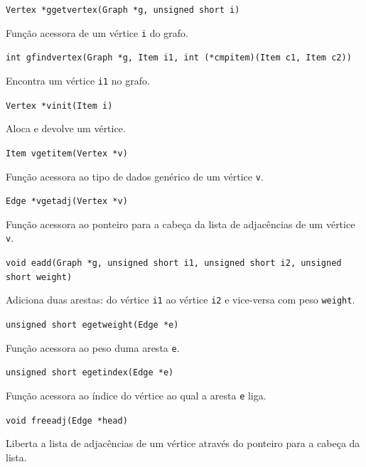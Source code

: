 \documentclass[portuguese, a4paper]{article}
\newcommand\tu[0]{\textunderscore}
\begin{document}
\begin{itemize}
		\par\null\par
		\texttt{Vertex *g\tu get\tu vertex(Graph *g, unsigned short i)}
		\par
		Função acessora de um vértice \texttt{i} do grafo.

		\par\null\par
		\texttt{int g\tu find\tu vertex(Graph *g, Item i1, int (*cmp\tu item)(Item c1,
		Item c2))}
		\par
		Encontra um vértice \texttt{i1} no grafo.

		\par\null\par
		\texttt{Vertex *v\tu init(Item i)}
		\par
		Aloca e devolve um vértice.

		\par\null\par
		\texttt{Item v\tu get\tu item(Vertex *v)}
		\par
		Função acessora ao tipo de dados genérico de um vértice \texttt{v}.

		\par\null\par
		\texttt{Edge *v\tu get\tu adj(Vertex *v)}
		\par
		Função acessora ao ponteiro para a cabeça da lista de adjacências de um
		vértice \texttt{v}.

		\par\null\par
		\texttt{void e\tu add(Graph *g, unsigned short i1, unsigned short i2, unsigned
				short weight)}
		\par
		Adiciona duas arestas: do vértice \texttt{i1} ao vértice \texttt{i2} e
		vice-versa com peso \texttt{weight}.

		\par\null\par
		\texttt{unsigned short e\tu get\tu weight(Edge *e)}
		\par
		Função acessora ao peso duma aresta \texttt{e}.

		\par\null\par
		\texttt{unsigned short e\tu get\tu index(Edge *e)}
		\par
		Função acessora ao índice do vértice ao qual a aresta \texttt{e} liga.

		\par\null\par
		\texttt{void free\tu adj(Edge *head)}
		\par
		Liberta a lista de adjacências de um vértice através do ponteiro para a
		cabeça da lista.


\end{itemize}
\end{document}
